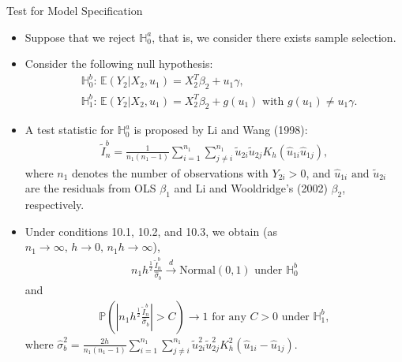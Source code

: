 \documentclass[xcolor=svgnames,dvipdfmx,cjk]{beamer}
\theoremstyle{example}
\def\E{\mathbb{E}}
\def\H{\mathbb{H}}
\def\P{\mathbb{P}}
\def\darrow{\xrightarrow{d}}
\begin{document}
\begin{frame}{Test for Model Specification}
      \begin{itemize}
            \item Suppose that we reject $\H_0^a$, that is, we consider there exists sample selection.
            \item Consider the following null hypothesis:
                  \begin{align*}
                        &\H_{0}^b: \, \E(Y_2|X_2, u_1) = X_2^T \beta_2 + u_1 \gamma, \\
                        &\H_{1}^b: \, \E(Y_2|X_2, u_1) = X_2^T \beta_2 + g(u_1) \text{ with } g(u_1) \neq u_1 \gamma.
                  \end{align*}
            \item A test statistic for $\H_{0}^a$ is proposed 
                  by Li and Wang (1998):
                  \begin{align*}
                        \tilde{I}_n^b 
                              = \frac{1}{n_1 (n_1 - 1)}
                                \sum_{i=1}^{n_1} \sum_{j \neq i}^{n_1}
                                \tilde{u}_{2i} \tilde{u}_{2j} K_h (\hat{u}_{1i} \hat{u}_{1j}),
                  \end{align*}
                  where $n_1$ denotes the number of observations with $Y_{2i} > 0$, and 
                  $\hat{u}_{1i} \text{ and } \tilde{u}_{2i}$ are the residuals 
                  from OLS $\beta_1$ and Li and Wooldridge's (2002) $\beta_2$, respectively.
      \end{itemize}
\end{frame}

\begin{frame}
      \begin{itemize}
            \item Under conditions 10.1, 10.2, and 10.3, we obtain 
                  (as $n_1 \to \infty, \, h \to 0,\, n_1 h \to \infty$),
                  \begin{align*}
                        n_1 h^{\frac{1}{2}}\frac{\tilde{I}_n^b}{\hat{\sigma}_b} \darrow \text{Normal} (0,1) \text{ under } \H_{0}^b
                  \end{align*}
                  and 
                  \begin{align*}
                        \P \left(
                              \left|
                                    n_1 h^{\frac{1}{2}}\frac{\tilde{I}_n^b}{\hat{\sigma}_b}  
                              \right| > C
                        \right) \to 1 \text{ for any } C>0 \text{ under } \H_{1}^b,
                  \end{align*}
                  where $\hat{\sigma}_b^2 
                              = \displaystyle\frac{2h}{n_1(n_1 - 1)}
                                \sum_{i=1}^{n_1} \sum_{j \neq i}^{n_1}
                                \tilde{u}_{2i}^2 \tilde{u}_{2j}^2 K_h^2 (\hat{u}_{1i} - \hat{u}_{1j})$.
      \end{itemize}
\end{frame}
\end{document}
